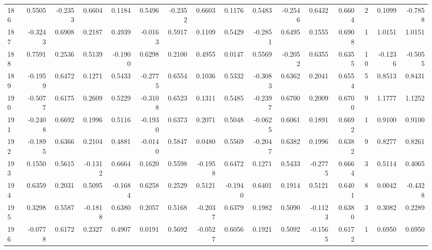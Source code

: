 \begin{tabular}{lrrrrrrrrrrrrrrr}
186 &      0.5505 & -0.2353 &  0.6604 &  0.1184 &  0.5496 & -0.2352 &  0.6603 &  0.1176 &  0.5483 & -0.2546 &   0.6432 &     0.6604 &      2 &                    0.1099 &                    -0.7858 \\
187 &     -0.3243 &  0.6908 &  0.2187 &  0.4939 & -0.0163 &  0.5917 &  0.1109 &  0.5429 & -0.2851 &  0.6495 &   0.1555 &     0.6908 &      1 &                    1.0151 &                     1.0151 \\
188 &      0.7591 &  0.2536 &  0.5139 & -0.1900 &  0.6298 &  0.2100 &  0.4955 &  0.0147 &  0.5569 & -0.2052 &   0.6355 &     0.6355 &     10 &                   -0.1236 &                    -0.5055 \\
189 &     -0.1959 &  0.6472 &  0.1271 &  0.5433 & -0.2775 &  0.6554 &  0.1036 &  0.5332 & -0.3083 &  0.6362 &   0.2041 &     0.6554 &      5 &                    0.8513 &                     0.8431 \\
190 &     -0.5077 &  0.6175 &  0.2609 &  0.5229 & -0.3108 &  0.6523 &  0.1311 &  0.5485 & -0.2397 &  0.6700 &   0.2009 &     0.6700 &      9 &                    1.1777 &                     1.1252 \\
191 &     -0.2408 &  0.6692 &  0.1996 &  0.5116 & -0.1930 &  0.6373 &  0.2071 &  0.5048 & -0.0625 &  0.6061 &   0.1891 &     0.6692 &      1 &                    0.9100 &                     0.9100 \\
192 &     -0.1895 &  0.6366 &  0.2104 &  0.4881 & -0.0140 &  0.5847 &  0.0480 &  0.5569 & -0.2047 &  0.6382 &   0.1996 &     0.6382 &      9 &                    0.8277 &                     0.8261 \\
193 &      0.1550 &  0.5615 & -0.1312 &  0.6664 &  0.1620 &  0.5598 & -0.1958 &  0.6472 &  0.1271 &  0.5433 &  -0.2775 &     0.6664 &      3 &                    0.5114 &                     0.4065 \\
194 &      0.6359 &  0.2031 &  0.5095 & -0.1684 &  0.6258 &  0.2529 &  0.5121 & -0.1940 &  0.6401 &  0.1914 &   0.5121 &     0.6401 &      8 &                    0.0042 &                    -0.4328 \\
195 &      0.3298 &  0.5587 & -0.1818 &  0.6380 &  0.2057 &  0.5168 & -0.2037 &  0.6379 &  0.1982 &  0.5090 &  -0.1123 &     0.6380 &      3 &                    0.3082 &                     0.2289 \\
196 &     -0.0778 &  0.6172 &  0.2327 &  0.4907 &  0.0191 &  0.5692 & -0.0527 &  0.6056 &  0.1921 &  0.5092 &  -0.1565 &     0.6172 &      1 &                    0.6950 &                     0.6950 \\

\end{tabular}
